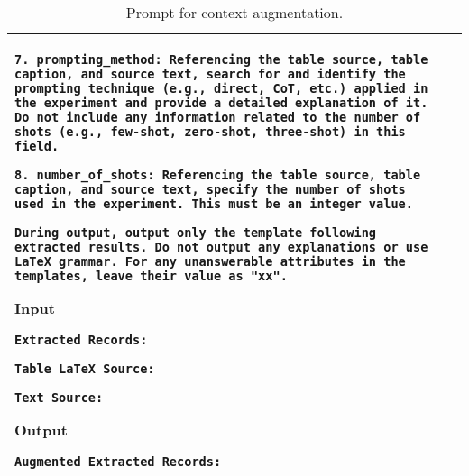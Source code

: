 \begin{table*}[ht]
\begin{tabular}{p{}|p{}}
\texttt{7. prompting\_method: Referencing the table source, table caption, and source text, search for and identify the prompting technique (e.g., direct, CoT, etc.) applied in the experiment and provide a detailed explanation of it. Do not include any information related to the number of shots (e.g., few-shot, zero-shot, three-shot) in this field.}  

\texttt{8. number\_of\_shots: Referencing the table source, table caption, and source text, specify the number of shots used in the experiment. This must be an integer value.}  \newline

\texttt{During output, output only the template following extracted results. Do not output any explanations or use LaTeX grammar. For any unanswerable attributes in the templates, leave their value as "xx".} 

\textbf{Input}

\texttt{Extracted Records: }  

\texttt{Table LaTeX Source: }  

\texttt{Text Source: }  

\textbf{Output}

\texttt{Augmented Extracted Records: }  \\
    \bottomrule
    \end{tabular}
    \caption{Prompt for context augmentation.}  
    \label{tab:prompt_example_context_augmentation}  
\end{table*}  










